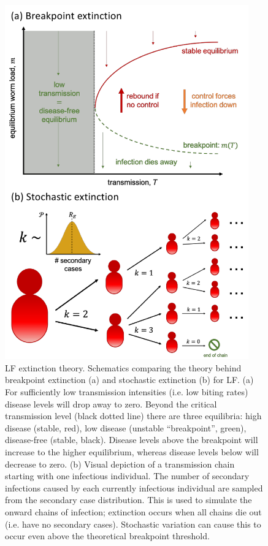 \begin{figure}
    \centering
    \includegraphics[height=15.3cm]{Project/Figures/LFElimination/Figure1.pdf}
    \caption[LF branching process extinction schematic.]{LF extinction theory. Schematics comparing the theory behind breakpoint extinction (a) and stochastic extinction (b) for LF. (a) For sufficiently low transmission intensities (i.e. low biting rates) disease levels will drop away to zero. Beyond the critical transmission level (black dotted line) there are three equilibria: high disease (stable, red), low disease (unstable “breakpoint”, green), disease-free (stable, black). Disease levels above the breakpoint will increase to the higher equilibrium, whereas disease levels below will decrease to zero. (b) Visual depiction of a transmission chain starting with one infectious individual. The number of secondary infections caused by each currently infectious individual are sampled from the secondary case distribution. This is used to simulate the onward chains of infection; extinction occurs when all chains die out (i.e. have no secondary cases). Stochastic variation can cause this to occur even above the theoretical breakpoint threshold.}
    \label{fig:Elim_1}
\end{figure}

